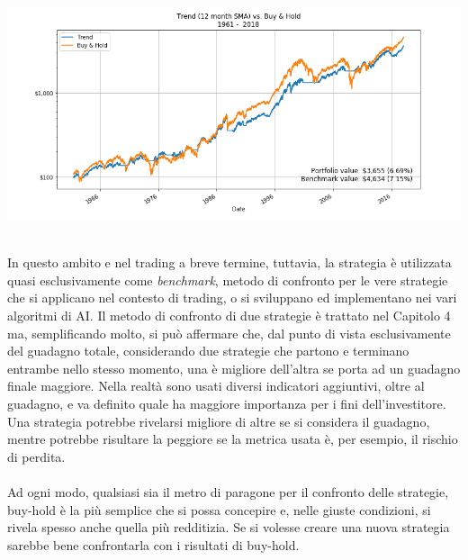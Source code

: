 \documentclass[a4paper,12pt]{report}
\begin{document}
\begin{fig}
	\begin{center}
	\includegraphics[width=16cm]{buy_hold}
\label{Figura 3}
	\end{center}
\end{fig}
\\ In questo ambito e nel trading a breve termine, tuttavia, la strategia è utilizzata quasi esclusivamente come \textit{benchmark}, metodo di confronto per le vere strategie che si applicano nel contesto di trading, o si sviluppano ed implementano nei vari algoritmi di AI. Il metodo di confronto di due strategie è trattato nel Capitolo 4 ma, semplificando molto, si può affermare che, dal punto di vista esclusivamente del guadagno totale, considerando due strategie che partono e terminano entrambe nello stesso momento, una è migliore dell'altra se porta ad un guadagno finale maggiore. Nella realtà sono usati diversi indicatori aggiuntivi, oltre al guadagno, e va definito quale ha maggiore importanza per i fini dell'investitore. Una strategia potrebbe rivelarsi migliore di altre se si considera il guadagno, mentre potrebbe risultare la peggiore se la metrica usata è, per esempio, il rischio di perdita.\\~\\Ad ogni modo, qualsiasi sia il metro di paragone per il confronto delle strategie, buy-hold è la più semplice che si possa concepire e, nelle giuste condizioni, si rivela spesso anche quella più redditizia. Se si volesse creare una nuova strategia sarebbe bene confrontarla con i risultati di buy-hold.
\end{document}
